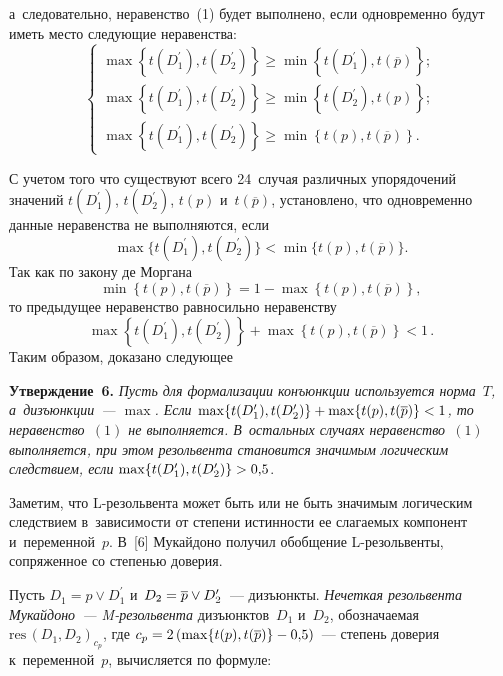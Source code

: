 \begin{multicols}{2}
  \noindent
   а~следовательно, 
неравенство~(1) будет выполнено, если одновременно будут иметь место 
следующие неравенства:
  \begin{equation*}
  \left\{
  \begin{array}{l}
  \max\left\{ t(D_1^\prime), t(D_2^\prime)\right\} \geq \min \left\{ t(D_1^\prime), 
t(\overline{p})\right\};\\[6pt]
  \max\left\{ t(D_1^\prime), t(D_2^\prime)\right\} \geq \min \left\{ t(D_2^\prime), 
t(p)\right\};\\[6pt]
  \max\left\{ t(D_1^\prime), t(D_2^\prime)\right\} \geq \min \left\{ t(p),  
t(\overline{p})\right\}.
  \end{array}
  \right.
  \end{equation*}
  
  С учетом того что существуют всего 24~случая различных упорядочений 
значений $t(D_1^\prime)$, $t(D_2^\prime)$, $t(p)$ и~$t(\overline{p})$, установлено, что 
одновременно данные неравенства не выполняются, если 
$$
\max \{ t\left(D_1^\prime\right), t\left(D_2^\prime\right)\} < \min \{ t(p), t\left(\overline{p}\right)\}.
$$
 Так как по 
закону де Моргана
$$
\min \left\{ t(p), t\left(\overline{p}\right)\right\} = 1- \max \left\{t(p),  t\left(\overline{p}\right)\right\},
$$
 то предыдущее неравенство равносильно неравенству 
 $$
 \max  \left\{ t\left(D_1^\prime\right), t\left(D_2^\prime\right)\right\} + \max \left\{ t(p), t\left(\overline{p}\right)\right\}<1\,. 
 $$
Таким образом, доказано следующее
  
  \smallskip
  
  \noindent
  \textbf{Утверждение~6.} \textit{Пусть для формализации конъюнкции 
используется норма~$T$, а~дизъюнкции~--- $\max$. Если $\max \{ 
t(D_1^\prime), t(D_2^\prime)\}\hm+ \max \{ t(p), t(\overline{p})\}\hm<1$, то 
неравенство~$(1)$ не выполняется. В~остальных случаях неравенство~$(1)$ 
выполняется, при этом резольвента становится значимым логическим 
следствием, если} $\max \{ t(D_1^\prime), t(D_2^\prime)\} \hm> 0{,}5$.
  
  \smallskip
  
  Заметим, что L-ре\-золь\-вен\-та может быть или не быть значимым 
логическим следствием в~за\-ви\-си\-мости от степени истинности ее слагаемых 
компонент и~переменной~$p$. В~[6] Мукайдоно получил обобщение  
L-ре\-золь\-вен\-ты, сопряженное со сте\-пенью доверия.
  
  Пусть $D_1=p\vee D_1^\prime$ и~$D_2\hm= \overline{p}\vee D_2^\prime$~--- 
дизъюнкты. \textit{Нечеткая резольвента Му\-кай\-до\-но~---  
\mbox{M-ре}\-золь\-вен\-та} дизъюнктов~$D_1$ и~$D_2$, обозначаемая $\mathrm{res}\,(D_1, 
D_2)_{c_p}$, где $c_p\hm= 2\left(\max \{ t(p), t(\overline{p})\}\hm- 
0{,}5\right)$~--- степень доверия к~переменной~$p$, вычисляется по формуле: 


\end{multicols}
